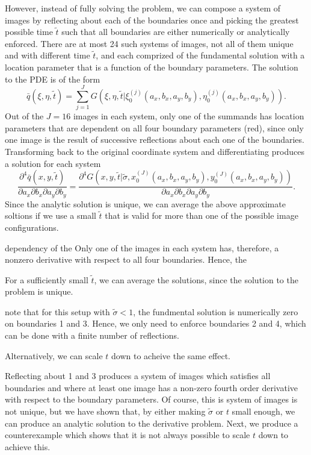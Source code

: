 \documentclass[10pt]{article}
\begin{document}
However, instead of fully solving the problem, we can compose a system
of images by reflecting about each of the boundaries once and picking
the greatest possible time $\tilde{t}$ such that all boundaries are
either numerically or analytically enforced. There are at most 24 such
systems of images, not all of them unique and with different time
$\tilde{t}$, and each comprized of the fundamental solution
with a location parameter that is a function of the boundary
parameters. The solution to the PDE is of the form
\[
  \bar{q}(\xi, \eta, \tilde{t}) = \sum_{j=1}^J G(\xi,\eta, \tilde{t}| \xi_0^{(j)}(a_x, b_x, a_y, b_y), \eta_0^{(j)}(a_x, b_x, a_y, b_y)).
\]
Out of the $J=16$ images in each system, only one of the summands has
location parameters that are dependent on all four boundary parameters
(red), since only one image is the result of successive reflections
about each one of the boundaries.  Transforming back to the original
coordinate system and differentiating produces a solution for each
system
\[
  \frac{\partial^4 \bar{q}(x, y, \tilde{t})}{\partial a_x
    \partial b_x \partial a_y \partial b_y} = \frac{\partial^4
    G(x,y, \tilde{t}| \tilde{\sigma}, x_0^{(J)}(a_x, b_x, a_y, b_y),
    y_0^{(J)}(a_x, b_x, a_y, b_y))} {\partial a_x \partial b_x
    \partial a_y \partial b_y}.
\]
Since the analytic solution is unique, we can average the above
approximate soltions if we use a small $\tilde{t}$ that is valid for
more than one of the possible image configurations.

dependency of the Only one of the images in each system has,
therefore, a nonzero derivative with respect to all four
boundaries. Hence, the

For a sufficiently small $\tilde{t}$, we
can average the solutions, since the solution to the problem is
unique. 



note that for this
setup with $\tilde{\sigma} < 1$, the fundmental solution is
numerically zero on boundaries 1 and 3. Hence, we only need to enforce
boundaries 2 and 4, which can be done with a finite number of reflections.

Alternatively, we can scale $t$ down to acheive the same effect. 

Reflecting about 1 and 3 produces a system of images which satisfies
all boundaries and where at least one image has a non-zero fourth
order derivative with respect to the boundary parameters. Of course,
this is system of images is not unique, but we have shown that, by
either making $\tilde{\sigma}$ or $t$ small enough, we can produce an
analytic solution to the derivative problem. Next, we produce a
counterexample which shows that it is not always possible to scale $t$
down to achieve this.
\end{document}
